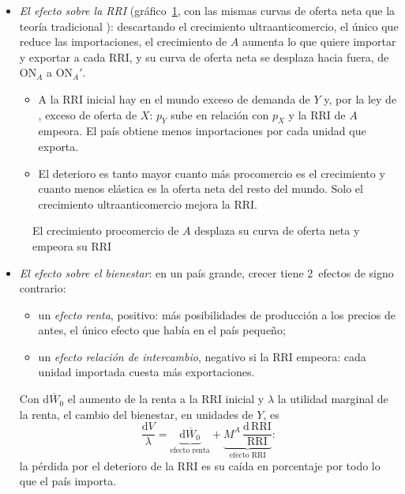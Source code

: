 \documentclass[11pt]{article}
\begin{document}
\begin{itemize}
\item \emph{El efecto sobre la RRI} (gráfico~\ref{fig:ofertas-netas-crecimiento}, con las mismas curvas de oferta neta que la teoría tradicional ): descartando el crecimiento ultraanticomercio, el único que reduce las importaciones, el crecimiento de $A$ aumenta lo que quiere importar y exportar a cada RRI, y su curva de oferta neta se desplaza hacia fuera, de ON$_A$ a ON$_A'$.
  \begin{itemize}
  \item A la RRI inicial hay en el mundo exceso de demanda de $Y$ y, por la ley de , exceso de oferta de $X$: $p_Y$ sube en relación con $p_X$ y la RRI de $A$ empeora. El país obtiene menos importaciones por cada unidad que exporta.
  \item El deterioro es tanto mayor cuanto más procomercio es el crecimiento y cuanto menos elástica es la oferta neta del resto del mundo. Solo el crecimiento ultraanticomercio mejora la RRI.
  \end{itemize}
\end{itemize}
\begin{figure}[H]
\centering
\caption{El crecimiento procomercio de $A$ desplaza su curva de oferta neta y empeora su RRI}\label{fig:ofertas-netas-crecimiento}
\end{figure}
\begin{itemize}
\item \emph{El efecto sobre el bienestar}: en un país grande, crecer tiene 2~efectos de signo contrario:
  \begin{itemize}
  \item un \emph{efecto renta}, positivo: más posibilidades de producción a los precios de antes, el único efecto que había en el país pequeño;
  \item un \emph{efecto relación de intercambio}, negativo si la RRI empeora: cada unidad importada cuesta más exportaciones.
  \end{itemize}
  Con $\mathrm{d}\overline W_0$ el aumento de la renta a la RRI inicial y $\lambda$ la utilidad marginal de la renta, el cambio del bienestar, en unidades de $Y$, es
  \begin{equation}\label{eq:bhagwati}
  \frac{\mathrm{d}V}{\lambda}=\underbrace{\mathrm{d}\overline W_0}_{\text{efecto renta}}+\underbrace{M^A\,\frac{\mathrm{d}\,\mathrm{RRI}}{\mathrm{RRI}}}_{\text{efecto RRI}}:
  \end{equation}
  la pérdida por el deterioro de la RRI es su caída en porcentaje por todo lo que el país importa.
\end{itemize}
\end{document}
